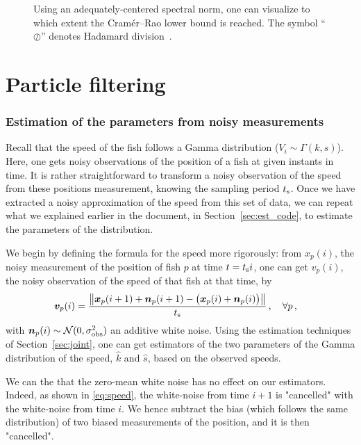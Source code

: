\documentclass[final]{aomart}
\newtheorem[{}\it]{thm}{Theorem}[section]
\theoremstyle{definition}
\newtheorem*[{}\it]{notation}{Notation}
\numberwithin{equation}{section}
\newcommand{\ts}{t_\textnormal{s}}
\newcommand{\enVert}[1]{\left\lVert#1\right\rVert}
\let\norm=\enVert
\begin{document}
\begin{figure}[!htbp]
	\centering
	\scalebox{0.75}{}
	\caption{Using an adequately-centered spectral norm, one can visualize to which extent the Cramér--Rao lower bound is reached.
	The symbol ``\(\oslash\)'' denotes Hadamard division~\cite{wiki:hadamard}.}
	\label{fig:CRLB}
\end{figure}

\part{Particle filtering}

\section{Estimation of the parameters from noisy measurements}
Recall that the speed of the fish follows a Gamma distribution (\(V_i \sim \Gamma(k, s)\)).
Here, one gets noisy observations of the position of a fish at given instants in time.
It is rather straightforward to transform a noisy observation of the speed from these positions measurement, knowing the sampling period \(\ts\).
Once we have extracted a noisy approximation of the speed from this set of data, we can repeat what we explained earlier in the document, in Section~\ref{sec:est_code}, to estimate the parameters of the distribution.

We begin by defining the formula for the speed more rigorously: from \(x_p(i)\), the noisy measurement of the position of fish \(p\) at time $t=\ts i$, one can get \(v_p(i)\), the noisy observation of the speed of that fish at that time, by
\begin{align}
	\bm{v}_p(i) &= \frac{\norm{\bm{x}_p(i+1) + \bm{n}_p(i+1) - \big(\bm{x}_p(i) + \bm{n}_p(i)\big)}}{\ts}\,, \quad \forall p\,,\label{eq:speed}
\end{align}
with \(\bm{n}_p(i) \sim \mathcal{N}(0, \sigma^2_{\textnormal{obs}})\) an additive white noise.
Using the estimation techniques of Section~\ref{sec:joint}, one can get estimators of the two parameters of the Gamma distribution of the speed, \(\hat{k}\) and \(\hat{s}\), based on the observed speeds.

We can the that the zero-mean white noise has no effect on our estimators. Indeed, as shown in \eqref{eq:speed}, the white-noise from time \(i+1\) is "cancelled" with the white-noise from time \(i\). We hence subtract the bias (which follows the same distribution) of two biased measurements of the position, and it is then "cancelled".
\end{document}
